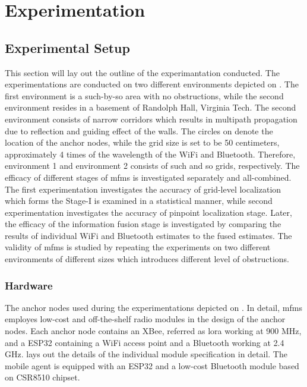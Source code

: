 \section{Experimentation}

    \subsection{Experimental Setup}
    This section will lay out the outline of the experimantation conducted.
    The experimentations are conducted on two different environments depicted on .
    The first environment is a such-by-so area with no obstructions, while the second environment resides in a basement of Randolph Hall, Virginia Tech.
    The second environment consists of narrow corridors which results in multipath propagation due to reflection and guiding effect of the walls.
    The circles on  denote the location of the anchor nodes, while the grid size is set to be 50 centimeters, approximately 4 times of the wavelength of the WiFi and Bluetooth.
    Therefore, environment 1 and environment 2 consists of such and so grids, respectively.
    The efficacy of different stages of \gls{mfms} is investigated separately and all-combined.
    The first experimentation investigates the accuracy of grid-level localization which forms the Stage-I is examined in a statistical manner, while second experimentation investigates the accuracy of pinpoint localization stage.
    Later, the efficacy of the information fusion stage is investigated by comparing the results of individual WiFi and Bluetooth estimates to the fused estimates.
    The validity of \gls{mfms} is studied by repeating the experiments on two different environments of different sizes which introduces different level of obstructions.

    \subsubsection{Hardware}
    The anchor nodes used during the experimentations depicted on .
    In detail, \gls{mfms} employes low-cost and off-the-shelf radio modules in the design of the anchor nodes.
    Each anchor node contains an XBee, referred as \gls{lora} working at 900 MHz, and a ESP32 containing a WiFi access point and a Bluetooth working at 2.4 GHz.
     lays out the details of the individual module specification in detail.
    The mobile agent is equipped with an ESP32 and a low-cost Bluetooth module based on CSR8510 chipset.

